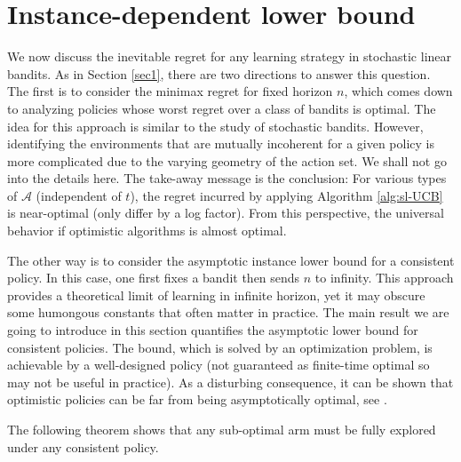 \documentclass[letterpaper,10pt,openright,openany]{book}
\numberwithin{equation}{section}
\theoremstyle{plain}
\theoremstyle{definition}
\begin{document}
\section{Instance-dependent lower bound}
We now discuss the inevitable regret for any learning strategy in stochastic linear bandits. As in Section \ref{sec1}, there are two directions to answer this question.  The first is to consider the minimax regret for fixed horizon $n$, which comes down to analyzing policies whose worst regret over a class of bandits is optimal. The idea for this approach is similar to the study of stochastic bandits. However, identifying the environments that are mutually incoherent for a given policy is more complicated due to the varying geometry of the action set. We shall not go into the details here. The take-away message is the conclusion: For various types of $\mathcal A$ (independent of $t$), the regret incurred by applying Algorithm \ref{alg:sl-UCB} is near-optimal (only differ by a log factor). From this perspective, the universal behavior if optimistic algorithms is almost optimal. 

The other way is to consider the asymptotic instance lower bound for a consistent policy.  In this case, one first fixes a bandit then sends $n$ to infinity. This approach provides a theoretical limit of learning in infinite horizon, yet it may obscure some humongous constants that often matter in practice. The main result we are going to introduce in this section quantifies the asymptotic lower bound for consistent policies. The bound, which is solved by an optimization problem, is achievable by a well-designed policy (not guaranteed as finite-time optimal so may not be useful in practice).  As a disturbing consequence, it can be shown that optimistic policies can be far from being asymptotically optimal, see \cite{lattimore2016end}. 

The following theorem shows that any sub-optimal arm must be fully explored under any consistent policy. 
\end{document}
